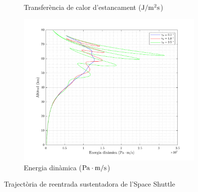 \begin{figure}[ht]
\begin{subfigure}[t]{.33\textwidth}
        \caption{Transferència de calor d'estancament ($\joule/\meter^2\second$)}
    \end{subfigure}%
    \begin{subfigure}[t]{.33\textwidth}
        \centering
        \includegraphics[width=\linewidth]{imagenes/02_lifting_graficas/energia_dinamica_no_title.pdf}
        \caption{Energia dinàmica ($\pascal \cdot \meter/\second$)}
    \end{subfigure}
    \caption{Trajectòria de reentrada sustentadora de l'Space Shuttle}
    \label{fig:lifting_terrestre}
\end{figure}

